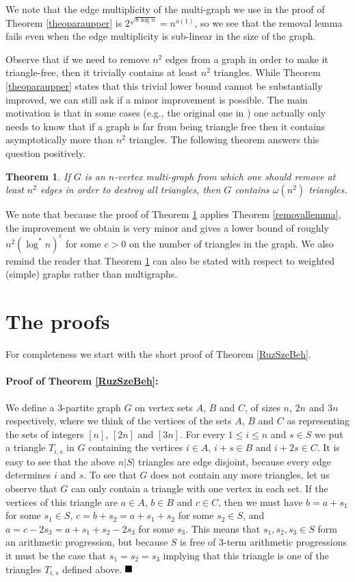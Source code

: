 \documentclass [letterpaper,11pt]{article}
\newtheorem{theo}{Theorem}%
\newcommand{\qed}{\hspace*{\fill} \rule{7pt}{7pt}}
\begin{document}
We note that the edge multiplicity of the multi-graph we use in the
proof of Theorem \ref {theoparaupper} is $2^{\sqrt{8\log
n}}=n^{o(1)}$, so we see that the removal lemma fails even when the
edge multiplicity is sub-linear in the size of the graph.

Observe that if we need to remove $n^2$ edges from a graph in order to
make it triangle-free, then it trivially contains at least $ n^2$
triangles. While Theorem \ref{theoparaupper} states that this
trivial lower bound cannot be substantially improved, we can still
ask if a minor improvement is possible. The main motivation is that in some
cases (e.g., the original one in \cite{RuS}) one actually only needs to know
that if a graph is far from being triangle free then it contains asymptotically
more
than $n^2$ triangles. The following theorem answers this question positively.

\begin{theo}\label{theoparalower} If $G$ is an $n$-vertex multi-graph
from which one should remove at least $n^2$ edges in order to
destroy all triangles, then $G$ contains $\omega(n^2)$ triangles.
\end{theo}

We note that because the proof of Theorem \ref{theoparalower}
applies Theorem \ref{removallemma}, the improvement we obtain is
very minor and gives a lower bound of roughly $n^2(\log^*n)^c$ for
some $c>0$ on the number of triangles in the graph. We also remind the reader
that Theorem \ref{theoparalower} can also be stated with respect to weighted
(simple) graphs rather than multigraphs.

\section{The proofs}

For completeness we start with the short proof of Theorem \ref{RuzSzeBeh}.

\paragraph{Proof of Theorem \ref{RuzSzeBeh}:} We define a 3-partite
graph $G$ on vertex sets $A$, $B$ and $C$, of sizes $n$, $2n$ and
$3n$ respectively, where we think of the vertices of the sets $A$,
$B$ and $C$ as representing the sets of integers $[n]$, $[2n]$ and
$[3n]$. For every $1 \leq i \leq n$ and $s \in S$ we put a triangle
$T_{i,s}$ in $G$ containing the vertices $i \in A$, $i+s \in B$ and
$i+2s \in C$. It is easy to see that the above $n|S|$ triangles are
edge disjoint, because every edge determines $i$ and $s$. To see
that $G$ does not contain any more triangles, let us observe that
$G$ can only contain a triangle with one vertex in each set. If the
vertices of this triangle are $a \in A$, $b \in B$ and $c \in C$,
then we must have $b=a+s_1$ for some $s_1 \in S$,
$c=b+s_2=a+s_1+s_2$ for some $s_2 \in S$, and
$a=c-2s_3=a+s_1+s_2-2s_3$ for some $s_3$. This means that
$s_1,s_2,s_3 \in S$ form an arithmetic progression, but because $S$
is free of 3-term arithmetic progressions it must be the case that
$s_1=s_2=s_3$ implying that this triangle is one of the triangles
$T_{i,s}$ defined above. $\qed$
\end{document}
